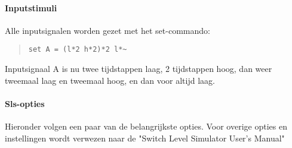 \paragraph{Inputstimuli}
Alle inputsignalen worden gezet met het set-commando:
\begin{quote}
\begin{verbatim}
set A = (l*2 h*2)*2 l*~
\end{verbatim}
\end{quote}
Inputsignaal A is nu twee tijdstappen laag, 2 tijdstappen hoog, dan weer tweemaal laag en
tweemaal hoog, en dan voor altijd laag.
\paragraph{Sls-opties}
Hieronder volgen een paar van de belangrijkste opties. Voor overige opties en instellingen
wordt verwezen naar de "Switch Level Simulator User's Manual"
